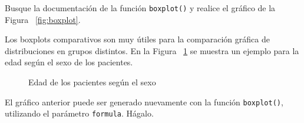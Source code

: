 \documentclass{../prob}
\begin{document}
\begin{problema}
	\begin{parte}
	Busque la documentación de la función \texttt{boxplot()} y realice el gráfico de la 	Figura ~\ref{fig:boxplot}.
	\end{parte}
	
	\begin{parte}
	Los boxplots comparativos son muy útiles para la comparación gráfica de distribuciones en grupos
distintos. En la Figura ~\ref{fig:boxplot2} se muestra un ejemplo para la edad según el sexo de los pacientes.

\begin{figure}[!ht]
    \centering
    
    \caption{Edad de los pacientes según el sexo}
    \label{fig:boxplot2}
\end{figure}		 
	\end{parte}

	El gráfico anterior puede ser generado nuevamente con la función \texttt{boxplot()}, utilizando el parámetro \texttt{formula}. Hágalo.\\
	
	\noindent{}
	

	
	\end{problema}
	
\end{document}
